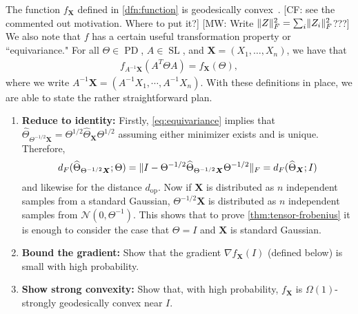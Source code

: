 \documentclass{article}
\DeclarePairedDelimiter{\norm}{\lVert}{\rVert}
\newcommand{\op}{\operatorname{op}}
\renewcommand{\vec}{\bm}
\newcommand\cN{\mathcal{N}}
\newcommand\SL{\operatorname{SL}}
\newcommand\PD{\operatorname{PD}}
\newcommand\tr{\operatorname{Tr}}
\newcommand{\CF}[1]{{\color{purple}[CF: #1]}}
\newcommand{\MW}[1]{{\color{red}[MW: #1]}}
\begin{document}
The function $f_{\vec X}$ defined in \cref{dfn:function} is geodesically convex~\cite{burgisser2019towards}. \CF{see the commented out motivation. Where to put it?}
\MW{Write $\norm Z_F^2 = \sum_i \norm{Z_i}_F^2$???}
We also note that $f$ has a certain useful transformation property or ``equivariance." For all $\Theta \in \PD$, $A \in \SL$, and $\vec X=(X_1,\dots,X_n)$, we have that
\begin{align}\label{eq:equivariance}
  f_{A^{-1} \vec X}(A^T \Theta A) = f_{\vec X}(\Theta),
\end{align}
where we write $A^{-1} \vec X = (A^{-1} X_1,\cdots,A^{-1} X_n)$.
With these definitions in place, we are able to state the rather straightforward plan.

\begin{enumerate}
\item\label{it:reduce} \textbf{Reduce to identity:}
Firstly, \cref{eq:equivariance} implies that $\widehat\Theta_{\Theta^{-1/2} \vec X} = \Theta^{1/2} \widehat\Theta_{\vec X} \Theta^{1/2}$ assuming either minimizer exists and is unique.
Therefore,
\begin{align*}
  d_F(\widehat\Theta_{\Theta^{-1/2} \vec X}; \Theta)
= \norm{ I - \Theta^{-1/2} \widehat\Theta_{\Theta^{-1/2} \vec X} \Theta^{-1/2} }_F
= d_F(\widehat\Theta_{\vec X}; I)
\end{align*}
and likewise for the distance $d_{\op}$.
Now if $\vec X$ is distributed as $n$ independent samples from a standard Gaussian, $\Theta^{-1/2} \vec X$ is distributed as $n$ independent samples from $\cN(0, \Theta^{-1})$.
This shows that to prove \cref{thm:tensor-frobenius} it is enough to consider the case that $\Theta = I$ and $\vec X$ is standard Gaussian.
\item\label{it:grad} \textbf{Bound the gradient:}
Show that the gradient $\nabla f_{\vec X}(I)$ (defined below) is small with high probability.
\item\label{it:convexity} \textbf{Show strong convexity:}
Show that, with high probability, $f_{\vec X}$ is $\Omega(1)$-strongly geodesically convex near $I$.
\end{enumerate}
\end{document}
